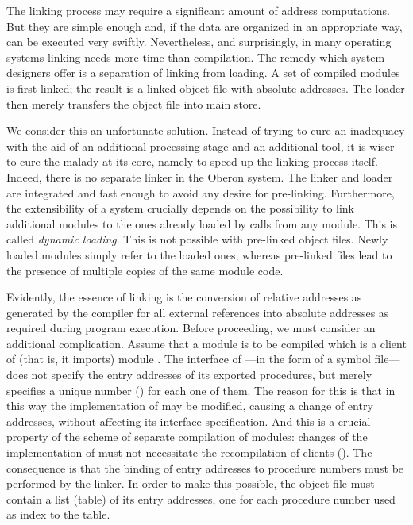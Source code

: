 The linking process may require a significant amount of address computations. But they are simple enough and, if the data are organized in an appropriate way, can be executed very swiftly. Nevertheless, and surprisingly, in many operating systems linking needs more time than compilation. The remedy which system designers offer is a separation of linking from loading. A set of compiled modules is first linked; the result is a linked object file with absolute addresses. The loader then merely transfers the object file into main store.

We consider this an unfortunate solution. Instead of trying to cure an inadequacy with the aid of an additional processing stage and an additional tool, it is wiser to cure the malady at its core, namely to speed up the linking process itself. Indeed, there is no separate linker in the Oberon system. The linker and loader are integrated and fast enough to avoid any desire for pre-linking. Furthermore, the extensibility of a system crucially depends on the possibility to link additional modules to the ones already loaded by calls from any module. This is called \emph{dynamic loading}. This is not possible with pre-linked object files. Newly loaded modules simply refer to the loaded ones, whereas pre-linked files lead to the presence of multiple copies of the same module code.


Evidently, the essence of linking is the conversion of relative addresses as generated by the compiler for all external references into absolute addresses as required during program execution. Before proceeding, we must consider an additional complication. Assume that a module  is to be compiled which is a client of (that is, it imports) module . The interface of ---in the form of a symbol file---does not specify the entry addresses of its exported procedures, but merely specifies a unique number () for each one of them. The reason for this is that in this way the implementation of  may be modified, causing a change of entry addresses, without affecting its interface specification. And this is a crucial property of the scheme of separate compilation of modules: changes of the implementation of  must not necessitate the recompilation of clients (). The consequence is that the binding of entry addresses to procedure numbers must be performed by the linker. In order to make this possible, the object file must contain a list (table) of its entry addresses, one for each procedure number used as index to the table.

